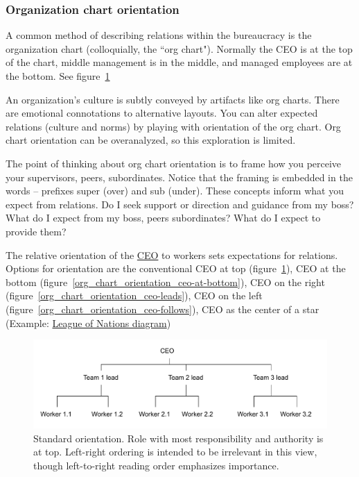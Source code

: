 \subsubsection{Organization chart orientation
\label{org-chart-orientation}}

A common method of describing relations within the bureaucracy is the organization chart (colloquially, the ``org chart"). Normally the CEO is at the top of the chart, middle management is in the middle, and managed employees are at the bottom. See figure~\ref{org_chart_orientation_ceo-at-top} 


An organization's culture is subtly conveyed by artifacts like org charts. 
There are emotional connotations to alternative layouts. You can alter expected relations (culture and norms) by playing with orientation of the org chart.
Org chart orientation can be overanalyzed, so this exploration is limited.

The point of thinking about org chart orientation is to frame how you perceive your supervisors, peers, subordinates. Notice that the framing is embedded in the words -- prefixes super (over) and sub (under). 
These concepts inform what you expect from relations.
Do I seek support or direction and guidance from my boss? What do I expect from my boss, peers subordinates? What do I expect to provide them?


The relative orientation of the \href{https://en.wikipedia.org/wiki/Chief_executive_officer}{CEO} to workers sets expectations for relations. 
Options for orientation are the conventional CEO at top
(figure~\ref{org_chart_orientation_ceo-at-top}), 
CEO at the bottom (figure~\ref{org_chart_orientation_ceo-at-bottom}),
CEO on the right (figure~\ref{org_chart_orientation_ceo-leads}),
CEO on the left (figure~\ref{org_chart_orientation_ceo-follows}),
CEO as the center of a star 
(Example: \href{https://en.wikipedia.org/wiki/File:League_of_Nations_Organization.png}{League of Nations diagram})

\begin{figure}
\includegraphics[width=1\textwidth]{images/org-chart-orientation-ceo-at-top.pdf}
\caption{Standard orientation. Role with most responsibility and authority is at top. Left-right ordering is intended to be irrelevant in this view, though left-to-right reading order emphasizes importance.}
\label{org_chart_orientation_ceo-at-top}
\end{figure}

